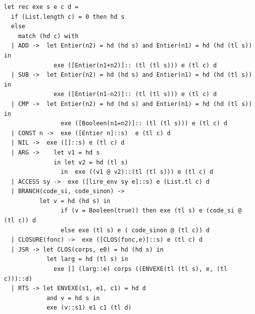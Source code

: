 \begin{footnotesize}
\begin{Verbatim}
let rec exe s e c d =
  if (List.length c) = 0 then hd s
  else
    match (hd c) with
  | ADD ->  let Entier(n2) = hd (hd s) and Entier(n1) = hd (hd (tl s)) in
              exe ([Entier(n1+n2)]:: (tl (tl s))) e (tl c) d  
  | SUB ->  let Entier(n2) = hd (hd s) and Entier(n1) = hd (hd (tl s)) in
              exe ([Entier(n1-n2)]:: (tl (tl s))) e (tl c) d  
  | CMP ->  let Entier(n2) = hd (hd s) and Entier(n1) = hd (hd (tl s)) in 
                exe ([Booleen(n1=n2)]:: (tl (tl s))) e (tl c) d   
  | CONST n ->  exe ([Entier n]::s)  e (tl c) d
  | NIL ->  exe ([]::s) e (tl c) d 
  | ARG ->    let v1 = hd s
              in let v2 = hd (tl s)
                in  exe ((v1 @ v2)::(tl (tl s))) e (tl c) d
  | ACCESS sy ->  exe ([lire_env sy e]::s) e (List.tl c) d
  | BRANCH(code_si, code_sinon) ->
          let v = hd (hd s) in 
                if (v = Booleen(true)) then exe (tl s) e (code_si @ (tl c)) d 
                else exe (tl s) e ( code_sinon @ (tl c)) d 
  | CLOSURE(fonc) ->  exe ([CLOS(fonc,e)]::s) e (tl c) d
  | JSR -> let CLOS(corps, e0) = hd (hd s) in
            let larg = hd (tl s) in 
              exe [] (larg::e) corps ((ENVEXE(tl (tl s), e, (tl c)))::d) 
  | RTS -> let ENVEXE(s1, e1, c1) = hd d 
            and v = hd s in
            exe (v::s1) e1 c1 (tl d)
\end{Verbatim}
\end{footnotesize}